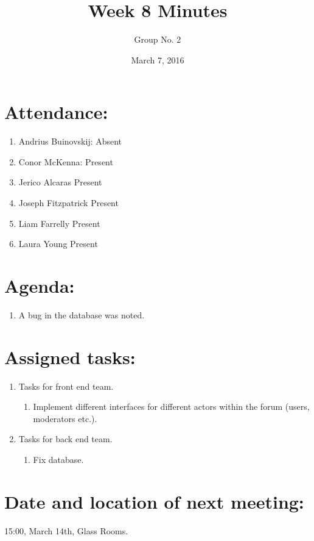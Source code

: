 \documentclass[a4paper, 12pt]{article}
\begin{document}
\title{Week 8 Minutes}
\author{Group No. 2}
\date{March 7, 2016}
\maketitle

	\section{Attendance:}
		\begin{enumerate}[label*=\arabic*.]
			\item Andrius Buinovskij:	\dotfill Absent
			\item Conor McKenna:		\dotfill Present
			\item Jerico Alcaras		\dotfill Present
			\item Joseph Fitzpatrick	\dotfill Present
			\item Liam Farrelly		\dotfill Present
			\item Laura Young		\dotfill Present
		\end{enumerate}

	\section{Agenda:}
		\begin{enumerate}[label*=\arabic*.]
			\item A bug in the database was noted.
		\end{enumerate}

	\newpage
	\section{Assigned tasks:}
		\begin{enumerate}[label*=\arabic*.]
			\item Tasks for front end team.
			\begin{enumerate}[label*=\arabic*.]
				\item Implement different interfaces for different actors within the forum (users, moderators etc.).
			\end{enumerate}
			\item Tasks for back end team.
			\begin{enumerate}[label*=\arabic*.]
				\item Fix database.
			\end{enumerate}
		\end{enumerate}

	\section{Date and location of next meeting:}
		15:00, March 14th, Glass Rooms.
\end{document}
